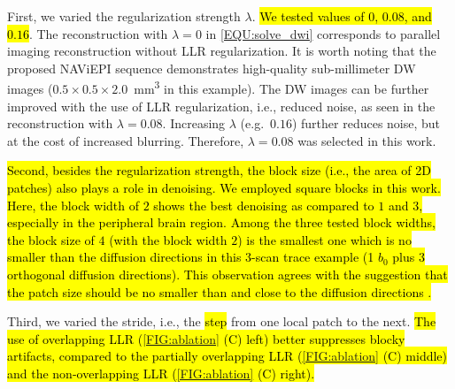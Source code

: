 \documentclass[preprint,12pt,authoryear,review]{elsarticle}
\begin{document}
    First, we varied the regularization strength $\lambda$.
    \hl{We tested values of $0$, $0.08$, and $0.16$}.
    The reconstruction with $\lambda = 0$ in \cref{EQU:solve_dwi}
    corresponds to parallel imaging reconstruction
    without LLR regularization.
    It is worth noting that the proposed NAViEPI sequence
    demonstrates high-quality sub-millimeter DW images
    ($0.5\times0.5\times2.0$~\si{\cubic\mm} in this example).
    The DW images can be further improved
    with the use of LLR regularization, i.e., reduced noise,
    as seen in the reconstruction with $\lambda=0.08$.
    Increasing $\lambda$ (e.g.~$0.16$) further reduces noise,
    but at the cost of increased blurring.
    Therefore, $\lambda=0.08$ was selected in this work.

    \hl{Second, besides the regularization strength,
    the block size (i.e., the area of 2D patches) also
    plays a role in denoising.
    We employed square blocks in this work.
    Here, the block width of $2$ shows the best denoising
    as compared to $1$ and $3$,
    especially in the peripheral brain region.
    Among the three tested block widths,
    the block size of $4$ (with the block width $2$)
    is the smallest one which is no smaller than the diffusion directions
    in this 3-scan trace example
    (1 $b_0$ plus 3 orthogonal diffusion directions).
    This observation agrees with the suggestion that
    the patch size should be no smaller than and close to
    the diffusion directions \mbox{\citep{cordero_2019_cplxdwi}}.}

    Third, we varied the stride, i.e.,
    the \hl{step} from one local patch to the next.
    \hl{The use of overlapping LLR
    (\mbox{\cref{FIG:ablation}} (C) left)
    better suppresses blocky artifacts,
    compared to the partially overlapping LLR
    (\mbox{\cref{FIG:ablation}} (C) middle)
    and the  non-overlapping LLR
    (\mbox{\cref{FIG:ablation}} (C) right).}
\end{document}

